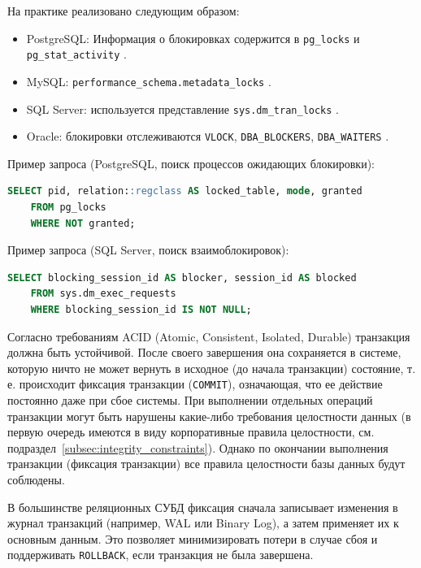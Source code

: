 На практике реализовано следующим образом:
\begin{itemize}
    \item PostgreSQL: Информация о блокировках содержится в \texttt{pg\_locks} и \texttt{pg\_stat\_activity} \autocites[§52.12]{PostgreSQLdocc52}[§27.2.3]{PostgreSQLdocc27}.
    \item MySQL: \texttt{performance\_schema.metadata\_locks} \autocite[§29.12.13]{Mysqldoc2}.
    \item SQL Server: используется представление \texttt{sys.dm\_tran\_locks} \autocite{MicrosoftLearnSQLserverTranLocks}.
    \item Oracle: блокировки отслеживаются \texttt{V\textdollar LOCK}, \texttt{DBA\_BLOCKERS}, \texttt{DBA\_WAITERS} \autocites[c.8 §40]{oracledbdoc2}[c.4 §180, c.6 §103]{oracledbdoc1}.
\end{itemize}

Пример запроса (PostgreSQL, поиск процессов ожидающих блокировки):
\begin{lstlisting}[language=SQL]
    SELECT pid, relation::regclass AS locked_table, mode, granted
    FROM pg_locks
    WHERE NOT granted;              
\end{lstlisting}

Пример запроса (SQL Server, поиск взаимоблокировок):
\begin{lstlisting}[language=SQL]
    SELECT blocking_session_id AS blocker, session_id AS blocked
    FROM sys.dm_exec_requests
    WHERE blocking_session_id IS NOT NULL;             
\end{lstlisting}

Согласно требованиям ACID (Atomic, Consistent, Isolated, Durable) транзакция должна быть устойчивой. После своего завершения она сохраняется в системе, которую ничто не может вернуть в исходное (до начала транзакции) состояние, т. е. происходит фиксация транзакции (\texttt{COMMIT}), означающая, что ее действие постоянно даже при сбое системы. При выполнении отдельных операций транзакции могут быть нарушены какие-либо требования целостности данных (в первую очередь имеются в виду корпоративные правила целостности, см. подраздел~\ref{subsec:integrity_constraints}). Однако по окончании выполнения транзакции (фиксация транзакции) все правила целостности базы данных будут соблюдены.

В большинстве реляционных СУБД фиксация сначала записывает изменения в журнал транзакций (например, WAL или Binary Log), а затем применяет их к основным данным. Это позволяет минимизировать потери в случае сбоя и поддерживать \texttt{ROLLBACK}, если транзакция не была завершена.

